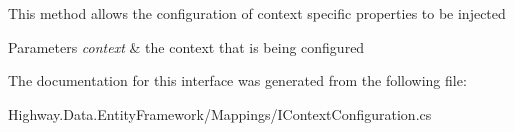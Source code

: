 This method allows the configuration of context specific properties to be injected 


\begin{DoxyParams}{Parameters}
{\em context} & the context that is being configured\\
\hline
\end{DoxyParams}


The documentation for this interface was generated from the following file\-:\begin{DoxyCompactItemize}
\item 
Highway.\-Data.\-Entity\-Framework/\-Mappings/I\-Context\-Configuration.\-cs\end{DoxyCompactItemize}
